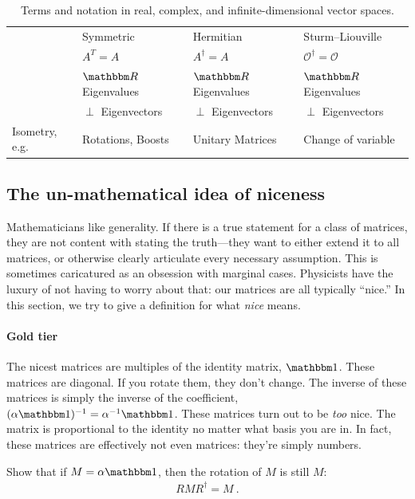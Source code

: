 \documentclass[12pt]{article}
\begin{document}
\begin{table}
\begin{tabular}{ @{} llll @{} }
            & Symmetric
            & Hermitian
            & Sturm--Liouville
        \\
            & $A^T = A$
            & $A^\dag = A$
            & $\mathcal O^\dag = \mathcal O$
        \\
            & $\RR$ Eigenvalues
            & $\RR$ Eigenvalues
            & $\RR$ Eigenvalues
        \\
            & $\perp$ Eigenvectors
            & $\perp$ Eigenvectors
            & $\perp$ Eigenvectors
        \\
        Isometry, e.g.
            & Rotations, Boosts
            & Unitary Matrices
            & Change of variable
        \\ \bottomrule
    \end{tabular}
    \caption{
        Terms and notation in real, complex, and infinite-dimensional vector spaces. 
        \label{table:vectors:conventions}
  }
\end{table}

\subsection{The un-mathematical idea of niceness}
\label{sec:nice}

Mathematicians like generality. If there is a true statement for a class of matrices, they are not content with stating the truth---they want to either extend it to all matrices, or otherwise clearly articulate every necessary assumption. This is sometimes caricatured as an obsession with marginal cases. Physicists have the luxury of not having to worry about that: our matrices are all typically ``nice.'' In this section, we try to give a definition for what \emph{nice} means. 

\paragraph{Gold tier} The nicest matrices are multiples of the identity matrix, $\one$. These matrices are diagonal. If you rotate them, they don't change. The inverse of these matrices is simply the inverse of the coefficient, $(\alpha \one)^{-1} = \alpha^{-1} \one$. These matrices turn out to be \emph{too} nice. The matrix is proportional to the identity no matter what basis you are in. In fact, these matrices are effectively not even matrices: they're simply numbers. 

\begin{exercise}
Show that if $M = \alpha \one$, then the rotation of $M$ is still $M$:
\begin{align}
    RMR^\dag = M \ .
\end{align}
\end{exercise}
\end{document}

